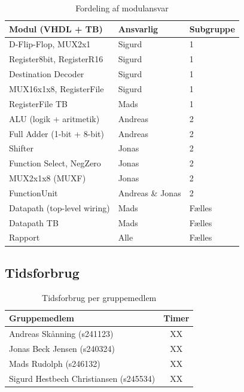\documentclass{article}
\begin{document}
\begin{table}[H]
    \centering
    \begin{tabular}{l|l|l}
        \textbf{Modul (VHDL + TB)} & \textbf{Ansvarlig} & \textbf{Subgruppe} \\
        \hline
        D-Flip-Flop, MUX2x1          & Sigurd  & 1 \\
        Register8bit, RegisterR16     & Sigurd  & 1 \\
        Destination Decoder           & Sigurd  & 1 \\
        MUX16x1x8, RegisterFile       & Sigurd  & 1 \\
        RegisterFile TB               & Mads    & 1 \\
        ALU (logik + aritmetik)       & Andreas & 2 \\
        Full Adder (1-bit + 8-bit)    & Andreas & 2 \\
        Shifter                       & Jonas   & 2 \\
        Function Select, NegZero      & Jonas   & 2 \\
        MUX2x1x8 (MUXF)              & Jonas   & 2 \\
        FunctionUnit                  & Andreas \& Jonas & 2 \\
        Datapath (top-level wiring)   & Mads    & Fælles \\
        Datapath TB                   & Mads    & Fælles \\
        Rapport                       & Alle    & Fælles \\
    \end{tabular}
    \caption{Fordeling af modulansvar}
    \label{tab:modulansvar}
\end{table}

\subsection*{Tidsforbrug}

\begin{table}[H]
    \centering
    \begin{tabular}{l|c}
        \textbf{Gruppemedlem} & \textbf{Timer} \\
        \hline
        Andreas Skånning (s241123)             & XX \\
        Jonas Beck Jensen (s240324)            & XX \\
        Mads Rudolph (s246132)                 & XX \\
        Sigurd Hestbech Christiansen (s245534) & XX \\
    \end{tabular}
    \caption{Tidsforbrug per gruppemedlem}
    \label{tab:tidsforbrug}
\end{table}

\ifdefined\mainfile\else
\end{document}
